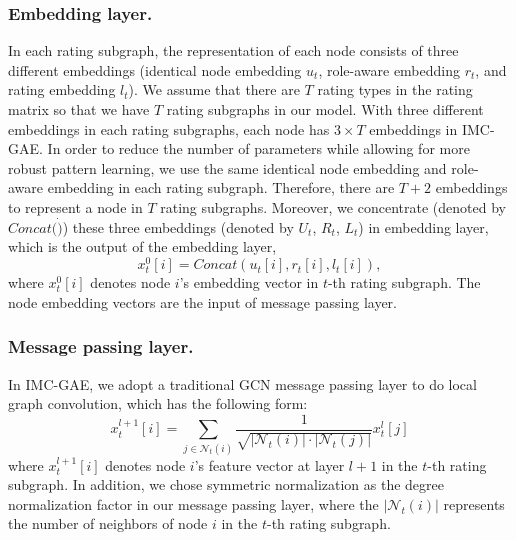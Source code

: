 \documentclass[sigconf]{acmart}
\begin{document}
\subsubsection{Embedding layer.} 
In each rating subgraph, the representation of each node consists of three different embeddings (identical node embedding $u_t$, role-aware embedding $r_t$, and rating embedding $l_t$). We assume that there are $T$ rating types in the rating matrix so that we have $T$ rating subgraphs in our model. With three different embeddings in each rating subgraphs, each node has $3 \times T$ embeddings in IMC-GAE. 
In order to reduce the number of parameters while allowing for more robust pattern learning, we use the same identical node embedding and role-aware embedding in each rating subgraph. 
Therefore, there are $T + 2$ embeddings to represent a node in $T$ rating subgraphs. Moreover, we concentrate (denoted by $Concat(\dot)$) these three embeddings (denoted by $U_t$, $R_t$, $L_t$) in embedding layer, which is the output of the embedding layer,
\begin{equation}
\label{eq:ini}
    x_t^0[i] = Concat(u_t[i], r_t[i], l_t[i]),
\end{equation}
where $x_t^0[i]$ denotes node $i$’s embedding vector in $t$-th rating subgraph. The node embedding vectors are the input of message passing layer.

\subsubsection{Message passing layer.} In IMC-GAE, we adopt a traditional GCN message passing layer to do local graph convolution, which has the following form:
\begin{equation}
    x_t^{l+1}[i] = \sum_{j \in \mathcal{N}_t(i)} \frac{1}{\sqrt{|\mathcal{N}_t(i)|\cdot |\mathcal{N}_t(j)|}}x_t^l[j]
\end{equation}
where $x_t^{l+1}[i]$ denotes node $i$’s feature vector at layer $l+1$ in the $t$-th rating subgraph. 
In addition, we chose symmetric normalization as the degree normalization factor in our message passing layer, where the $|\mathcal{N}_t(i)|$ represents the number of neighbors of node $i$ in the $t$-th rating subgraph. 
\end{document}
